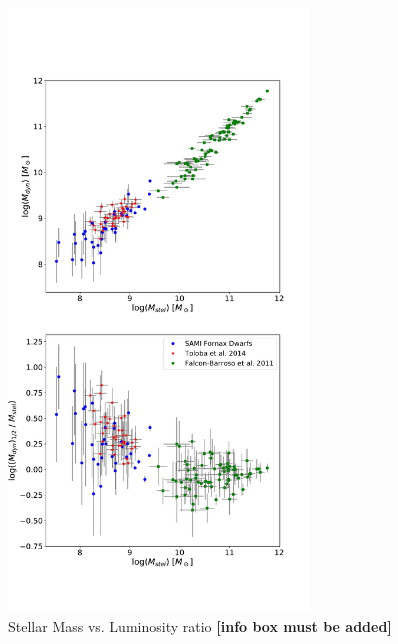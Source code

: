\documentclass{aa}
\begin{document}
\begin{figure}[!htb]
   \centering
   \includegraphics[width=8cm]{../2_pipeline/2_MassDyn_Luminosity+Liter/DyM_StM+Liter_DWARF.pdf}   		
  	 \caption{Stellar Mass vs. Luminosity ratio \textbf{[info box must be added]}}
         \label{fig:MM}
\end{figure}
\end{document}
